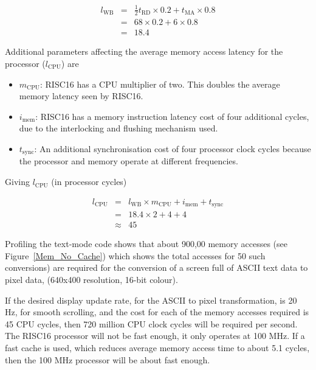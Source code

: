 \begin{eqnarray*}
l_\mathrm{WB}	& = & \frac{1}{2}t_\mathrm{RD}\times 0.2 + t_\mathrm{MA} \times
0.8 \\
& = & 68 \times 0.2 + 6 \times 0.8 \\
& = & 18.4
\end{eqnarray*}

Additional parameters affecting the average memory access latency for the
processor ($l_\mathrm{CPU}$) are
\begin{itemize}
  \item $m_\mathrm{CPU}$: RISC16 has a CPU multiplier of two. This doubles
  the average memory latency seen by RISC16.
  \item $i_\mathrm{mem}$: RISC16 has a memory instruction latency cost of four
  additional cycles, due to the interlocking and flushing mechanism used.
  \item $t_\mathrm{sync}$: An additional synchronisation cost of four
  processor clock cycles because the processor and memory operate at different
  frequencies.
\end{itemize}
Giving $l_\mathrm{CPU}$ (in processor cycles)

\begin{eqnarray*}
l_\mathrm{CPU}	& = & l_\mathrm{WB} \times m_\mathrm{CPU} + i_\mathrm{mem} +
t_\mathrm{sync} \\
				& = & 18.4 \times 2 + 4 + 4 \\
				& \approx & 45
\end{eqnarray*}

Profiling the text-mode code shows that about 900,00 memory accesses (see
Figure~\ref{Mem_No_Cache}) which shows the total accesses for 50 such
conversions) are required for the conversion of a screen full of ASCII text data
to pixel data, (640x400 resolution, 16-bit colour).

If the desired display update rate, for the ASCII to pixel transformation, is 20
Hz, for smooth scrolling, and the cost for each of the memory accesses required
is 45 CPU cycles, then 720 million CPU clock cycles will be required per second.
The RISC16 processor will not be fast enough, it only operates at 100 MHz. If a
fast cache is used, which reduces average memory access time to about 5.1 cycles,
then the 100 MHz processor will be about fast enough.

% 

